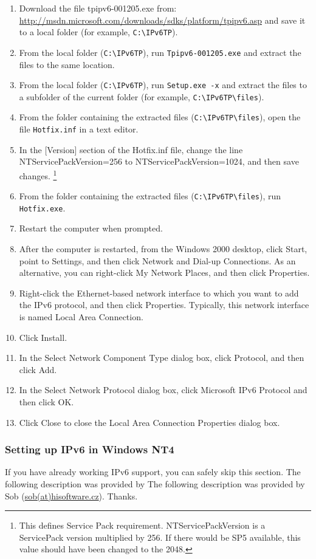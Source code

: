\begin{enumerate}
  \item Download the file tpipv6-001205.exe from:
    \url{http://msdn.microsoft.com/downloads/sdks/platform/tpipv6.asp}
    and save it to a local folder (for example, \verb+C:\IPv6TP+).
  \item From the local folder (\verb+C:\IPv6TP+), run \verb+Tpipv6-001205.exe+ and extract the
    files to the same location.
  \item From the local folder (\verb+C:\IPv6TP+), run \verb+Setup.exe -x+ and extract the files to
    a subfolder of the current folder (for example, \verb+C:\IPv6TP\files+).
  \item From the folder containing the extracted files (\verb+C:\IPv6TP\files+), open the
    file \verb+Hotfix.inf+ in a text editor.
  \item In the [Version] section of the Hotfix.inf file, change the line
    NTServicePackVersion=256 to NTServicePackVersion=1024, and then
    save changes. \footnote{This defines Service Pack requirement.
      NTServicePackVersion is a ServicePack version multiplied by 256. If there
    would be SP5 available, this value should have been changed to the 2048.}
  \item From the folder containing the extracted files (\verb+C:\IPv6TP\files+), run
    \verb+Hotfix.exe+.
  \item Restart the computer when prompted.
  \item After the computer is restarted, from the Windows 2000 desktop, click Start,
    point to Settings, and then click Network and Dial-up Connections. As an
    alternative, you can right-click My Network Places, and then click Properties.
  \item Right-click the Ethernet-based network interface to which you want to add the IPv6
    protocol, and then click Properties. Typically, this network interface is named
    Local Area Connection.
  \item Click Install.
  \item In the Select Network Component Type dialog box, click Protocol, and then
    click Add.
  \item In the Select Network Protocol dialog box, click Microsoft IPv6 Protocol and
    then click OK.
  \item Click Close to close the Local Area Connection Properties
    dialog box.
\end{enumerate}

\subsubsection{Setting up IPv6 in Windows NT4}
If you have already working IPv6 support, you can safely skip this section.
The following description was provided by The following description was provided by Sob
(\href{mailto:sob(at)hisoftware.cz}{sob(at)hisoftware.cz}). Thanks.

